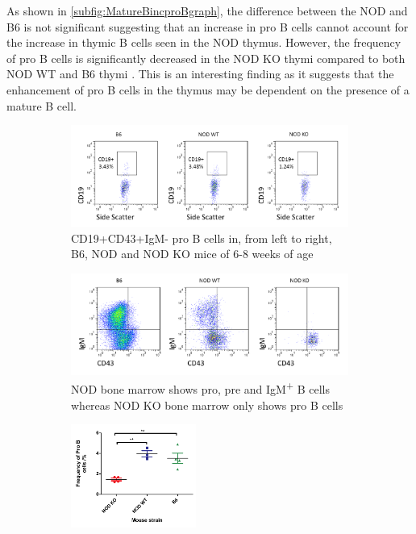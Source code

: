 As shown in \cref{subfig:MatureBincproBgraph}, the difference between the NOD and B6 is not significant suggesting that an increase in pro B cells cannot account for the increase in thymic B cells seen in the NOD thymus.
However, the frequency of pro B cells is significantly decreased in the NOD KO thymi compared to both NOD WT and B6 thymi .
This is an interesting finding as it suggests that the enhancement of pro B cells in the thymus may be dependent on the presence of a mature B cell.


\begin{figure}
	\begin{subfigure}{\textwidth}
	\includegraphics[width=\textwidth]{Figures/MatureBincproB.png}
	\caption{CD19+CD43+IgM- pro B cells in, from left to right, B6, NOD and NOD KO mice of 6-8 weeks of age}
	\end{subfigure}
	\begin{subfigure}{\textwidth}
	\centering
	\includegraphics[width=\textwidth]{Figures/B6NODKOBM.png}
	\caption{NOD bone marrow shows pro, pre and IgM\textsuperscript{+} B cells whereas NOD KO bone marrow only shows pro B cells}
	\label{subfig:KOBM}
	\end{subfigure}
	\begin{subfigure}{\textwidth}
	\centering
	\includegraphics[width=0.45\textwidth]{Figures/MatureBincproBgraph.pdf}

\end{subfigure}
\end{figure}
